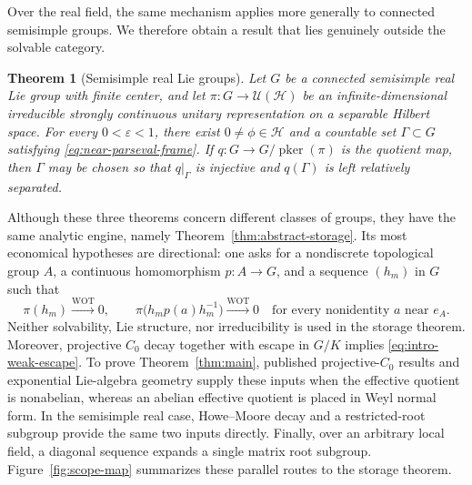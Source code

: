 \documentclass[10pt,a4paper]{amsart}
\numberwithin{equation}{section}
\newtheorem{theorem}{Theorem}[section]
\newcommand{\cH}{\mathcal H}
\newcommand{\U}{\mathcal U}
\newcommand{\pker}{\operatorname{pker}}
\begin{document}
Over the real field, the same mechanism applies more generally to connected
semisimple groups.  We therefore obtain a result that lies genuinely outside
the solvable category.

\begin{theorem}[Semisimple real Lie groups]\label{thm:simple-main}
Let $G$ be a connected semisimple real Lie group with finite center,
and let $\pi:G\to\U(\cH)$ be an infinite-dimensional irreducible strongly
continuous unitary representation on a separable Hilbert space.  For every
$0<\varepsilon<1$, there exist $0\neq\phi\in\cH$ and a countable set
$\Gamma\subset G$ satisfying \eqref{eq:near-parseval-frame}.  If
$q:G\to G/\pker(\pi)$ is the quotient map, then $\Gamma$ may be chosen so
that $q|_\Gamma$ is injective and $q(\Gamma)$ is left relatively separated.
\end{theorem}

Although these three theorems concern different classes of groups, they have
the same analytic engine, namely Theorem~\ref{thm:abstract-storage}.  Its most
economical hypotheses are directional: one asks for a nondiscrete topological
group $A$,
a continuous homomorphism $p:A\to G$, and a sequence $(h_m)$ in $G$ such that
\begin{equation}\label{eq:intro-weak-escape}
 \pi(h_m)\xrightarrow{\mathrm{WOT}}0,
 \qquad
 \pi\bigl(h_m p(a)h_m^{-1}\bigr)
       \xrightarrow{\mathrm{WOT}}0
 \quad\text{for every nonidentity $a$ near $e_A$}.
\end{equation}
Neither solvability, Lie structure, nor irreducibility is used in the storage
theorem.  Moreover, projective $C_0$ decay together with escape in $G/K$
implies \eqref{eq:intro-weak-escape}.  To prove Theorem~\ref{thm:main}, published
projective-$C_0$ results and exponential Lie-algebra geometry supply these
inputs when the effective quotient is nonabelian, whereas an abelian
effective quotient is placed in Weyl normal form.  In the semisimple real
case, Howe--Moore decay and a restricted-root subgroup provide the same two
inputs directly.  Finally, over an arbitrary local field, a diagonal sequence
expands a single matrix root subgroup.  Figure~\ref{fig:scope-map} summarizes
these parallel routes to the storage theorem.
\end{document}
